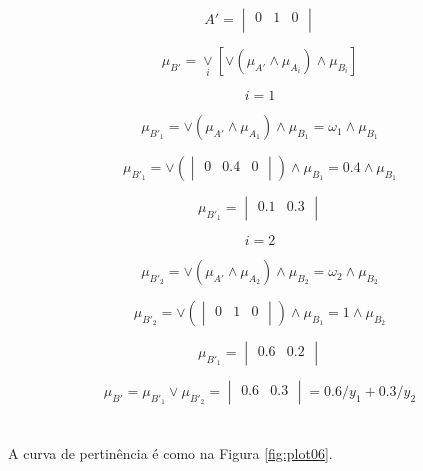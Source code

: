 \documentclass[conference]{IEEEtran}
\begin{document}
\[
A' = 
\begin{vmatrix}
0 & 1 & 0 \\
\end{vmatrix}
\]

\hfill


\[
\mu_{B'} = \underset{i}{\vee} [\vee (\mu_{A'} \wedge \mu_{A_i}) \wedge \mu_{B_i}]
\]

\[i = 1\]

\[
\mu_{B'_1} = \vee (\mu_{A'} \wedge \mu_{A_1}) \wedge \mu_{B_1} = \omega_1 \wedge \mu_{B_1}
\]

\[
\mu_{B'_1} = \vee (
\begin{vmatrix}
0 & 0.4 & 0 \\
\end{vmatrix}
) \wedge \mu_{B_1} = 0.4 \wedge \mu_{B_1}
\]

\[
\mu_{B'_1} = 
\begin{vmatrix}
0.1 & 0.3 \\
\end{vmatrix}
\]


\[i = 2\]

\[
\mu_{B'_2} = \vee (\mu_{A'} \wedge \mu_{A_2}) \wedge \mu_{B_2} = \omega_2 \wedge \mu_{B_2}
\]

\[
\mu_{B'_2} = \vee (
\begin{vmatrix}
0 & 1 & 0 \\
\end{vmatrix}
) \wedge \mu_{B_1} = 1 \wedge \mu_{B_2}
\]

\[
\mu_{B'_1} = 
\begin{vmatrix}
0.6 & 0.2 \\
\end{vmatrix}
\]

\[
\mu_{B'} = \mu_{B'_1} \vee \mu_{B'_2} = 
\begin{vmatrix}
0.6 & 0.3 \\
\end{vmatrix}
= 0.6/y_1 + 0.3/y_2
\]

\hfill
\section{}  %

\par A curva de pertinência é como na Figura \ref{fig:plot06}.
\end{document}
